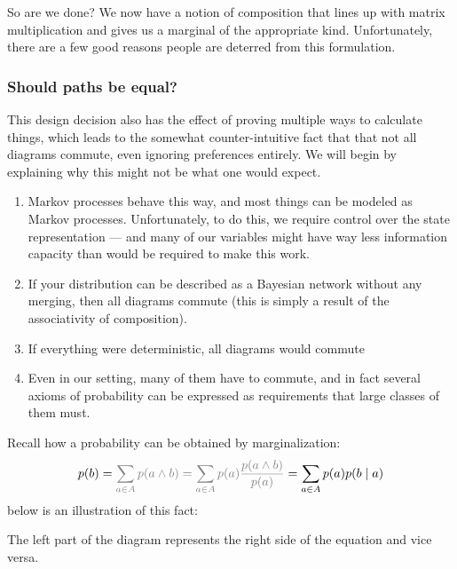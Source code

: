 \documentclass{article}
\begin{document}
	So are we done? We now have a notion of composition that lines up with matrix multiplication and gives us a marginal of the appropriate kind. Unfortunately, there are a few good reasons people are deterred from this formulation. 
	

	
	\subsubsection{Should paths be equal?}
	
	This design decision also has the effect of proving multiple ways to calculate things, which leads to the somewhat counter-intuitive fact that that not all diagrams commute, even ignoring preferences entirely. We will begin by explaining why this might not be what one would expect. 
	\begin{enumerate}
		\item Markov processes behave this way, and most things can be modeled as Markov processes. Unfortunately, to do this, we require control over the state representation --- and many of our variables might have way less information capacity than would be required to make this work.
		\item If your distribution can be described as a Bayesian network without any merging, then all diagrams commute (this is simply a result of the associativity of composition).
		\item If everything were deterministic, all diagrams would commute
		\item Even in our setting, many of them have to commute, and in fact several axioms of probability can be expressed as requirements that large classes of them must.
	\end{enumerate}

	
	\begin{example}[Marginalization] \label{ex:margin}
		Recall how a probability can be obtained by marginalization:
		\[ p(b) = {\color{gray}\sum_{a \in A} p(a \land b) = \sum_{a \in A} p(a) \frac{p(a\land b)}{p(a)} }= \sum_{a \in A} p(a) p(b\mid a) \]
		below is an illustration of this fact:
		\begin{center}
		\end{center}
		The left part of the diagram represents the right side of the equation and vice versa. 
	\end{example} 
\end{document}
